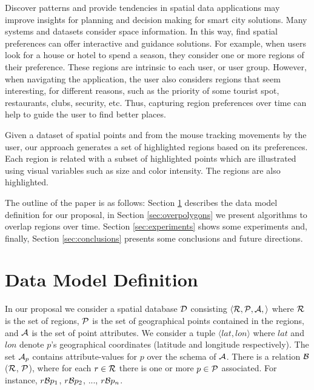 \documentclass[runningheads,a4paper]{llncs}
\begin{document}
Discover patterns and provide tendencies in spatial data applications may improve insights for planning and decision making for smart city solutions. Many systems and datasets consider space information.  In this way, find spatial preferences can offer interactive and guidance solutions.  For example,  when users look for a house or hotel to spend a season, they consider one or more regions of their preference. These regions are intrinsic to each user, or user group. However, when navigating the application, the user also considers regions that seem interesting, for different reasons, such as the priority of some tourist spot, restaurants, clubs, security, etc. Thus, capturing region preferences over time can help to guide the user to find better places.
 

Given a dataset of spatial points and from the mouse tracking movements by the user, our approach generates a set of highlighted regions based on its preferences. Each region is related with a subset of highlighted points which are illustrated using visual variables such as size and color intensity. The regions are also highlighted.


The outline of the paper is as follows: Section \ref{sec:datamodel} describes the data model definition for our proposal, in Section \ref{sec:overpolygons}  we present algorithms to overlap regions over time. Section  \ref{sec:experiments}  shows some  experiments and, finally, Section \ref{sec:conclusions}  presents some conclusions and future directions. 

\section{Data Model Definition}
\label{sec:datamodel}

In our proposal we consider a spatial database ${\cal D}$ consisting $\langle {\cal R},  {\cal P}, {\cal A},  \rangle$ where ${\cal R}$ is the set of regions, ${\cal P}$ is the set of
geographical points contained in the regions, and ${\cal A}$ is the set of point attributes. We consider a tuple $\langle lat, lon\rangle$ where $lat$ and $lon$ denote $p$'s geographical coordinates (latitude and longitude  respectively). The set ${\cal A}_p$ contains attribute-values for $p$ over the schema of ${\cal A}$.  There is a relation ${\cal B}$ (${\cal R}$, ${\cal P}$), where for each $r \in	{\cal R}$ there is one or more $p \in {\cal P}$ associated. For instance, $r{\cal B}p_1$, $r{\cal B}p_2$, ..., $r{\cal B}p_n$.  
\end{document}
